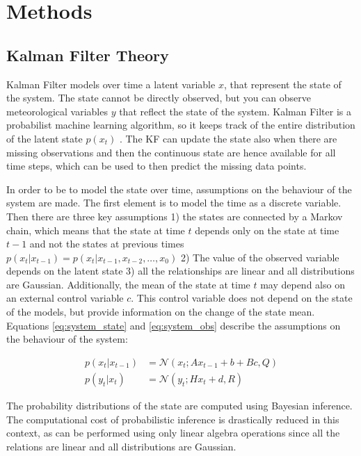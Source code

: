 \documentclass{article}
\newcommand{\norm}[3]{\mathcal{N}\left(#1; #2, #3\right)} %
\let\Oldsection\section
\renewcommand{\section}{\FloatBarrier\Oldsection}
\let\Oldsubsection\subsection
\renewcommand{\subsection}{\FloatBarrier\Oldsubsection}
\begin{document}
\section{Methods}

\subsection{Kalman Filter Theory}

Kalman Filter models over time a latent variable $x$, that represent the state of the system. The state cannot be directly observed, but you can observe meteorological variables $y$ that reflect the state of the system. 
Kalman Filter is a probabilist machine learning algorithm, so it keeps track of the entire distribution of the latent state $p(x_t)$ \cite{2020_hennig_pml}.
The KF can update the state also when there are missing observations and then the continuous state  are hence available for all time steps, which can be used to then predict the missing data points.

In order to be to model the state over time, assumptions on the behaviour of the system are made. The first element is to model the time as a discrete variable.  Then there are three key assumptions 1) the states are connected by a Markov chain, which means that the state at time $t$ depends only on the state at time $t-1$ and not the states at previous times $p(x_t|x_{t-1}) = p(x_t|x_{t-1}, x_{t-2}, \hdots, x_0)$ 2) The value of the observed variable depends on the latent state 3) all the relationships are linear and all distributions are Gaussian. Additionally, the mean of the state at time $t$ may depend also on an external control variable $c$. This control variable does not depend on the state of the models, but provide information on the change of the state mean.
Equations \ref{eq:system_state} and \ref{eq:system_obs} describe the assumptions on the behaviour of the system:

\begin{align}
p(x_t | x_{t-1}) &= \norm{x_t}{Ax_{t-1} + b + Bc}{Q} \label{eq:system_state}\\
p(y_t | x_t) &= \norm{y_t}{Hx_t + d}{R} \label{eq:system_obs}
\end{align}

The probability distributions of the state are computed using Bayesian inference. The computational cost of probabilistic inference is drastically reduced in this context, as can be performed using only linear algebra operations since all the relations are linear and all distributions are Gaussian.
\end{document}
